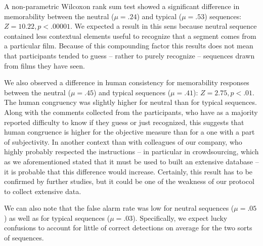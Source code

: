 \documentclass[sigconf]{acmart}
\begin{document}
A non-parametric Wilcoxon rank sum test showed a significant difference in memorability between the neutral ($\mu=.24$) and typical ($\mu=.53$) sequences: $Z=10.22, p<.00001$.
We expected a result in this sens because neutral sequence contained less contextual elements useful to recognize that a segment comes from a particular film.
Because of this compounding factor this results does not mean that participants tended to guess -- rather to purely recognize -- sequences drawn from films they have seen.

We also observed a difference in human consistency for memorability responses between the neutral ($\mu=.45$) and typical sequences ($\mu=.41$): $Z=2.75, p<.01$.
The human congruency was slightly higher for neutral than for typical sequences.
Along with the comments collected from the participants, who have as a majority reported difficulty to know if they guess or just recognized, this suggests that human congruence is higher for the objective measure than for a one with a part of subjectivity. In another context than with colleagues of our company, who highly probably respected the instructions -- in particular in crowdsourcing, which as we aforementioned stated that it must be used to built an extensive database -- it is probable that this difference would increase.
Certainly, this result has to be confirmed by further studies, but it could be one of the weakness of our protocol to collect extensive data.

We can also note that the false alarm rate was low for neutral sequences ($\mu=.05$) as well as for typical sequences ($\mu=.03$).
Specifically, we expect lucky confusions to account for little of correct detections on average for the two sorts of sequences.

\end{document}
